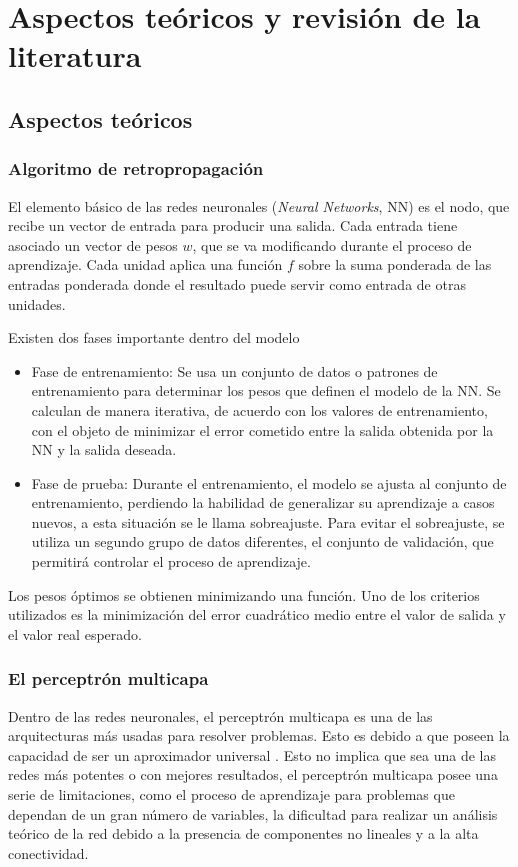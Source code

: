 \chapter{Aspectos teóricos y revisión de la literatura}
\section{Aspectos teóricos}
\subsection{Algoritmo de retropropagación}
El elemento básico de las redes neuronales ({\em Neural Networks}, NN) es el nodo, que recibe un vector de entrada para producir una salida. Cada entrada tiene asociado un vector de pesos $w$, que se va modificando durante el proceso de aprendizaje. Cada unidad aplica una función $f$ sobre la suma ponderada de las entradas ponderada
donde el resultado puede servir como entrada de otras unidades.

Existen dos fases importante dentro del modelo
\begin{itemize}
	\item Fase de entrenamiento: Se usa un conjunto de datos o patrones de entrenamiento para determinar los pesos que definen el modelo de la NN. Se calculan de manera iterativa, de acuerdo con los valores de entrenamiento, con el objeto de minimizar el error cometido entre la salida obtenida por la NN y la salida deseada.

	\item Fase de prueba: Durante el entrenamiento, el modelo se ajusta al conjunto de entrenamiento, perdiendo la habilidad de generalizar su aprendizaje a casos nuevos, a esta situación se le llama sobreajuste.
	Para evitar el sobreajuste, se utiliza un segundo grupo de datos diferentes, el conjunto de validación, que permitirá controlar el proceso de aprendizaje.
\end{itemize}
Los pesos óptimos se obtienen minimizando una función. Uno de los criterios utilizados es la minimización del error cuadrático medio entre el valor de salida y el valor real esperado.


\subsection{El perceptrón multicapa}
Dentro de las redes neuronales, el perceptrón multicapa es una de las arquitecturas más usadas para resolver problemas. Esto es debido a que poseen la capacidad de ser un aproximador universal \cite{Minsky1969b}. Esto no implica que sea una de las redes más potentes o con mejores resultados, el perceptrón multicapa posee una serie de limitaciones, como el proceso de aprendizaje para problemas que dependan de un gran número de variables, la dificultad para realizar un análisis teórico de la red debido a la presencia de componentes no lineales y a la alta conectividad.

